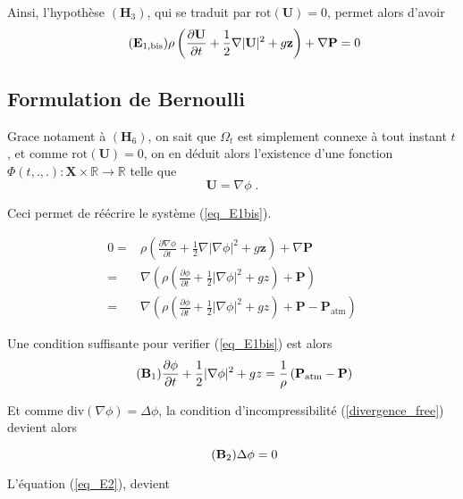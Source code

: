 \documentclass[12pt,a4paper]{article}
\newcommand{\rot}{\text{rot}}
\numberwithin{equation}{section}
\begin{document}
Ainsi, l'hypothèse $(\textbf{H}_3)$, qui se traduit par $\rot(\textbf{U})=0$, permet alors d'avoir 
\begin{equation} \tag{$\textbf{E}_{1,\text{bis}}$} \label{eq_E1bis}
        \rho \left( \frac{\partial \textbf{U}}{\partial t} +\frac{1}{2}\nabla  |\textbf{U}|^2 +  g\textbf{z}\right) + \nabla \textbf{P} = 0 
\end{equation}

\subsection{Formulation de Bernoulli}

Grace notament à $(\textbf{H}_6)$, on sait que $\Omega_t$ est simplement connexe à tout instant $t$, et comme $\rot(\textbf{U}) = 0$, on en déduit alors l'existence d'une fonction $\Phi(t,.,.): \textbf{X}\times \mathbb{R} \rightarrow \mathbb{R}$ telle que $$\textbf{U} = \nabla \phi  \;.$$    

Ceci permet de réécrire le système (\ref{eq_E1bis}).

\begin{align*}
    0 = &\rho \left ( \frac{\partial \nabla \phi }{\partial t} +\frac{1}{2}\nabla  |\nabla \phi|^2  +  g\textbf{z} \right)+ \nabla \textbf{P} 
    \\
    =&\nabla \left ( \rho \left ( \frac{\partial \phi }{\partial t} +\frac{1}{2}|\nabla \phi|^2 +  gz \right) + \textbf{P} \right)
    \\
    =&\nabla \left ( \rho \left ( \frac{\partial \phi }{\partial t} +\frac{1}{2}|\nabla \phi|^2 +  gz \right) + \textbf{P}  - \textbf{P}_{\text{atm}}\right)
\end{align*}

Une condition suffisante pour verifier (\ref{eq_E1bis}) est alors
\begin{equation} \tag{$\textbf{B}_1$} \label{eq_B1}
  \frac{\partial \phi }{\partial t} +\frac{1}{2}|\nabla \phi|^2 +  gz   = \frac{1}{\rho}\left( \textbf{P}_{\text{atm}}  - \textbf{P}\right)
\end{equation}

Et comme $\text{div}(\nabla \phi) = \Delta \phi$, la condition d'incompressibilité (\ref{divergence_free}) devient alors

\begin{equation} \tag{$\textbf{B}_2$} \label{eq_B2}
    \Delta \phi = 0
\end{equation}

L'équation (\ref{eq_E2}), devient
\end{document}
